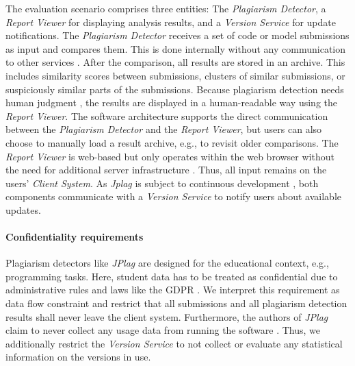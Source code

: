 The evaluation scenario comprises three entities: The \emph{Plagiarism Detector}, a \emph{Report Viewer} for displaying analysis results, and a \emph{Version Service} for update notifications.
The \emph{Plagiarism Detector} receives a set of code or model submissions as input and compares them.
This is done internally without any communication to other services \cite{saglam_jplag_2024}.
After the comparison, all results are stored in an archive.
This includes similarity scores between submissions, clusters of similar submissions, or suspiciously similar parts of the submissions.
Because plagiarism detection needs human judgment \cite{saglam_obfuscation-resilient_2024,saglam_detecting_2024}, the results are displayed in a human-readable way using the \emph{Report Viewer}.
The software architecture supports the direct communication between the \emph{Plagiarism Detector} and the \emph{Report Viewer}, but users can also choose to manually load a result archive, e.g., to revisit older comparisons.
The \emph{Report Viewer} is web-based but only operates within the web browser without the need for additional server infrastructure \cite{saglam_jplag_2024}.
Thus, all input remains on the users' \emph{Client System}.
As \emph{Jplag} is subject to continuous development \cite{saglam_jplag_2024}, both components communicate with a \emph{Version Service} to notify users about available updates.

\paragraph{Confidentiality requirements}
Plagiarism detectors like \emph{JPlag} are designed for the educational context, e.g., programming tasks.
Here, student data has to be treated as confidential due to administrative rules and laws like the \acf{GDPR} \cite{council_of_european_union_regulation_2016}.
We interpret this requirement as data flow constraint and restrict that all submissions and all plagiarism detection results shall never leave the client system.
Furthermore, the authors of \emph{JPlag} claim to never collect any usage data from running the software \cite{saglam_jplag_2024}.
Thus, we additionally restrict the \emph{Version Service} to not collect or evaluate any statistical information on the versions in use.

